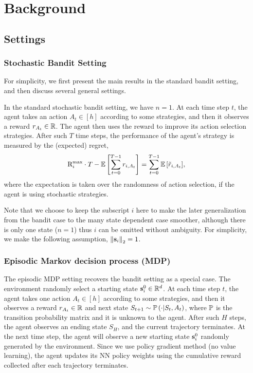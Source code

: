 \section{Background}

\subsection{Settings}

\subsubsection{Stochastic Bandit Setting}

For simplicity, we first present the main results in the standard bandit setting, and then discuss several general settings.

In the standard stochastic bandit setting, we have $n = 1$. At each time step $t$, the agent takes an action $A_t \in [h]$ according to some strategies, and then it observes a reward $r_{A_t} \in {\mathbb{R}}$. The agent then uses the reward to improve its action selection strategies. After such $T$ time steps, the performance of the agent's strategy is measured by the (expected) regret,
\begin{equation}
\label{eq:expected_regret}
    {\text{R}}_i^{\max} \cdot T - {\mathbb{E}} \left[ \sum\limits_{t=0}^{T-1}{  r_{i, A_t}  } \right] = \sum\limits_{t=0}^{T-1}{ {\mathbb{E}} \left[ \tilde{r}_{i, A_t} \right] },
\end{equation}
where the expectation is taken over the randomness of action selection, if the agent is using stochastic strategies.

Note that we choose to keep the subscript $i$ here to make the later generalization from the bandit case to the many state dependent case smoother, although there is only one state ($n = 1$) thus $i$ can be omitted without ambiguity. For simplicity, we make the following assumption, $\left\| {\mathbf{s}}_{i} \right\|_2 = 1$.

\subsubsection{Episodic Markov decision process (MDP)}

The episodic MDP setting recovers the bandit setting as a special case. The environment randomly select a starting state ${\mathbf{s}}_i^0 \in {\mathbb{R}}^d$. At each time step $t$, the agent takes one action $A_t \in [h]$ according to some strategies, and then it observes a reward $r_{A_t} \in {\mathbb{R}}$ and next state $S_{t+1} \sim {\mathbb{P}}\left( \cdot \middle| S_t, A_t \right)$, where ${\mathbb{P}}$ is the transition probability matrix and it is unknown to the agent. After such $H$ steps, the agent observes an ending state $S_H$, and the current trajectory terminates. At the next time step, the agent will observe a new starting state ${\mathbf{s}}_i^0$ randomly generated by the environment. Since we use policy gradient method (no value learning), the agent updates its NN policy weights using the cumulative reward collected after each trajectory terminates.

